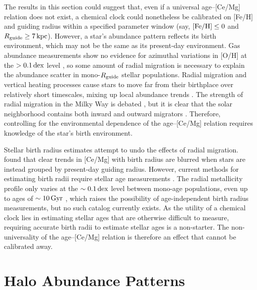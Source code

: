 \documentclass[twocolumn,twocolappendix]{aastex701}
\newcommand{\bracket}[2][H]{{\rm [#2/#1]}}
\newcommand{\kpc}{\,{\rm kpc}}
\newcommand{\Gyr}{\,{\rm Gyr}}
\newcommand{\dex}{\,{\rm dex}}
\begin{document}
The results in this section could suggest that, even if a universal age--[Ce/Mg] relation does not exist, a chemical clock could nonetheless be calibrated on [Fe/H] and guiding radius within a specified parameter window (say, $\bracket{Fe}\leq0$ and $R_{\rm guide}\geq7\kpc$). However, a star's abundance pattern reflects its birth environment, which may not be the same as its present-day environment. Gas abundance measurements show no evidence for azimuthal variations in [O/H] at the $>0.1\dex$ level \citep{mendez-delgado_gradients_2022,martinez-hernandez_desired_2026}, so some amount of radial migration is necessary to explain the abundance scatter in mono-$R_{\rm guide}$ stellar populations. Radial migration and vertical heating processes cause stars to move far from their birthplace over relatively short timescales, mixing up local abundance trends \citep{sellwood_radial_2002,schonrich_chemical_2009}. The strength of radial migration in the Milky Way is debated \citep[e.g.,][]{frankel_measuring_2018,chen_open_2020,lian_quantifying_2022,lehmann_probing_2024}, but it is clear that the solar neighborhood contains both inward and outward migrators \citep{schonrich_chemical_2009,johnson_stellar_2021}. Therefore, controlling for the environmental dependence of the age--[Ce/Mg] relation requires knowledge of the star's birth environment.

Stellar birth radius estimates attempt to undo the effects of radial migration. \citet{ratcliffe_chemical_2024} found that clear trends in [Ce/Mg] with birth radius are blurred when stars are instead grouped by present-day guiding radius. However, current methods for estimating birth radii require stellar age measurements \citep{ratcliffe_unveiling_2023,lu_there_2024}. The radial metallicity profile only varies at the $\sim0.1\dex$ level between mono-age populations, even up to ages of $\sim10\Gyr$ \citep{johnson_milky_2025}, which raises the possibility of age-independent birth radius measurements, but no such catalog currently exists. As the utility of a chemical clock lies in estimating stellar ages that are otherwise difficult to measure, requiring accurate birth radii to estimate stellar ages is a non-starter. The non-universality of the age--[Ce/Mg] relation is therefore an effect that cannot be calibrated away.

\section{Halo Abundance Patterns}
\label{sec:halo}
\end{document}
